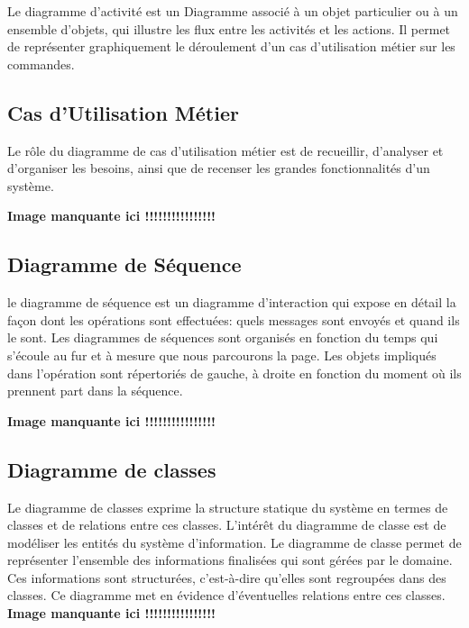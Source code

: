 Le diagramme d’activité est un Diagramme associé à un objet particulier ou à un ensemble d’objets, qui illustre les flux entre les activités et les actions. Il permet de représenter graphiquement le déroulement d’un cas d’utilisation métier sur les commandes.



\subsection{Cas d'Utilisation Métier}


Le rôle du diagramme de cas d’utilisation métier est de recueillir, d’analyser et d’organiser les besoins, ainsi que de recenser les grandes fonctionnalités d’un système. 

%	

\textbf{Image manquante ici !!!!!!!!!!!!!!!!}


\subsection{Diagramme de Séquence}

le diagramme de séquence est un diagramme d’interaction qui expose en détail
la façon dont les opérations sont effectuées: quels messages sont envoyés et quand ils le sont. Les diagrammes de séquences sont organisés en fonction du temps qui s’écoule au fur et à mesure que nous parcourons la page. Les objets impliqués dans l’opération sont répertoriés de gauche, à droite en fonction du moment où ils prennent part dans la séquence.

\textbf{Image manquante ici !!!!!!!!!!!!!!!!}


\subsection*{Diagramme de classes}

Le diagramme de classes exprime la structure statique du système en termes de classes et de relations entre ces classes. L’intérêt du diagramme de classe est de modéliser les entités du système d’information.
Le diagramme de classe permet de représenter l’ensemble des informations finalisées qui sont gérées par le domaine. Ces informations sont structurées, c’est-à-dire qu’elles sont regroupées dans des classes. Ce
diagramme met en évidence d’éventuelles relations entre ces classes.
%
\textbf{Image manquante ici !!!!!!!!!!!!!!!!}



